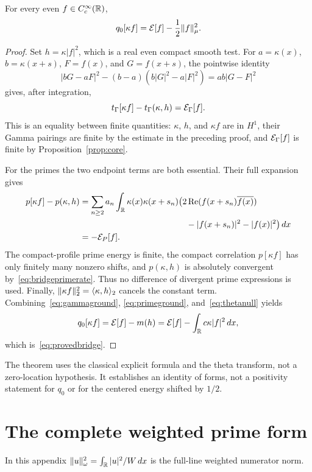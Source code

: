 \begin{theorem}\label{thm:compactbridge}
For every even $f\in C_c^\infty(\mathbb R)$,
\begin{equation}\label{eq:provedbridge}
 q_0[\kappa f]=\mathcal E[f]-\frac12\lVert f\rVert_\mu^2.
\end{equation}
\end{theorem}
\begin{proof}
Set $h=\kappa|f|^2$, which is a real even compact smooth test. For $a=\kappa(x)$, $b=\kappa(x+s)$, $F=f(x)$, and $G=f(x+s)$, the pointwise identity
\[
 |bG-aF|^2-(b-a)(b|G|^2-a|F|^2)=ab|G-F|^2
\]
gives, after integration,
\begin{equation}\label{eq:gammaground}
 t_\Gamma[\kappa f]-t_\Gamma(\kappa,h)=\mathcal E_\Gamma[f].
\end{equation}
This is an equality between finite quantities: $\kappa$, $h$, and $\kappa f$ are in $H^1$, their Gamma pairings are finite by the estimate in the preceding proof, and $\mathcal E_\Gamma[f]$ is finite by Proposition~\ref{prop:core}.

For the primes the two endpoint terms are both essential. Their full expansion gives
\begin{align}\label{eq:primeground}
 p[\kappa f]-p(\kappa,h)
 &=\sum_{n\ge2}a_n\int_\R\kappa(x)\kappa(x+s_n)
       \bigl(2\operatorname{Re}(f(x+s_n)\overline{f(x)})\notag\\
 &\hspace{44mm}-|f(x+s_n)|^2-|f(x)|^2\bigr)\,dx\notag\\
 &=-\E_P[f].
\end{align}
The compact-profile prime energy is finite, the compact correlation $p[\kappa f]$ has only finitely many nonzero shifts, and $p(\kappa,h)$ is absolutely convergent by~\eqref{eq:bridgeprimerate}. Thus no difference of divergent prime expressions is used. Finally,
$\lVert\kappa f\rVert_2^2=\langle\kappa,h\rangle_2$ cancels the constant term. Combining~\eqref{eq:gammaground}, \eqref{eq:primeground}, and~\eqref{eq:thetanull} yields
\[
 q_0[\kappa f]=\mathcal E[f]-m(h)
             =\mathcal E[f]-\int_\mathbb R c\kappa|f|^2\,dx,
\]
which is~\eqref{eq:provedbridge}.
\end{proof}

The theorem uses the classical explicit formula and the theta transform, not a zero-location hypothesis. It establishes an identity of forms, not a positivity statement for $q_0$ or for the centered energy shifted by $1/2$.

\section{The complete weighted prime form}\label{sec:prime}
In this appendix $\lVert u\rVert_\omega^2=\int_\mathbb R |u|^2/W\,dx$ is the full-line weighted numerator norm.

